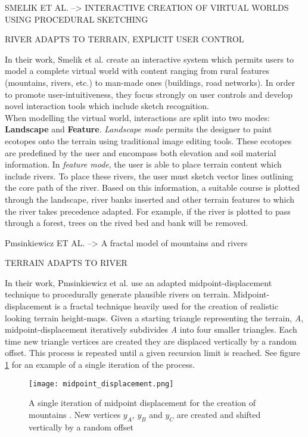 SMELIK ET AL. --> INTERACTIVE CREATION OF VIRTUAL WORLDS USING PROCEDURAL SKETCHING

RIVER ADAPTS TO TERRAIN, EXPLICIT USER CONTROL

In their work, Smelik et al. create an interactive system which permits users to model a complete virtual world with content ranging from rural features (mountains, rivers, etc.) to man-made ones (buildings, road networks). In order to promote user-intuitiveness, they focus strongly on user controls and develop novel interaction tools which include sketch recognition.\\
When modelling the virtual world, interactions are split into two modes: \textbf{Landscape} and \textbf{Feature}. \textit{Landscape mode} permits the designer to paint ecotopes onto the terrain using traditional image editing tools. These ecotopes are predefined by the user and encompass both elevation and soil material information. In \textit{feature mode}, the user is able to place terrain content which include rivers. To place these rivers, the user must sketch vector lines outlining the core path of the river. Based on this information, a suitable course is plotted through the landscape, river banks inserted and other terrain features to which the river takes precedence adapted. For example, if the river is plotted to pass through a forest, trees on the rived bed and bank will be removed. 


Pmsinkiewicz ET AL. --> A fractal model of mountains and rivers

TERRAIN ADAPTS TO RIVER

In their work, Pmsinkiewicz et al. use an adapted midpoint-displacement technique to procedurally generate plausible rivers on terrain. Midpoint-displacement is a fractal technique heavily used for the creation of realistic looking terrain height-maps. Given a starting triangle representing the terrain, \textit{A}, midpoint-displacement iteratively subdivides \textit{A} into four smaller triangles. Each time new triangle vertices are created they are displaced vertically by a random offset. This process is repeated until a given recursion limit is reached. See figure \ref{Midpoint displacement} for an example of a single iteration of the process.

\begin{figure}[h]
  \centering
	\label{Midpoint displacement}
	\texttt{[image: midpoint\_displacement.png]}
	\caption{A single iteration of midpoint displacement for the creation of mountains \cite{Prusinkiewicz1993}. New vertices $y_{A}$, $y_{B}$ and $y_{C}$ are created and shifted vertically by a random offset}
\end{figure}

